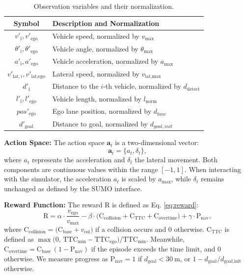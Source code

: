 \begin{table}[!ht]
    \centering
    \caption{Observation variables and their normalization.}
    \label{tab:obs}
    \begin{tabularx}{\columnwidth}{cX} %
    \toprule
    \textbf{Symbol} & \textbf{Description and Normalization} \\
    \midrule
    $v'_{\text{i}}, v'_{\text{ego}}$           & Vehicle speed, normalized by $v_{\text{max}}$ \\
    $\theta'_{\text{i}}, \theta'_{\text{ego}}$ & Vehicle angle, normalized by $\theta_{\text{max}}$ \\
    $a'_{\text{i}}, a'_{\text{ego}}$           & Vehicle acceleration, normalized by $a_{\text{max}}$ \\
    $v'_{\text{lat},i}, v'_{\text{lat,ego}}$   & Lateral speed, normalized by $v_{\text{lat,max}}$ \\
    $d'_{\text{i}}$                     & Distance to the $i$-th vehicle, normalized by $d_{\text{detect}}$ \\
    $l'_{\text{i}}, l'_{\text{ego}}$           & Vehicle length, normalized by $l_{\text{norm}}$ \\
    $pos'_{\text{ego}}$                 & Ego lane position, normalized by $d_{lane}$ \\
    $d'_{\text{goal}}$                  & Distance to goal, normalized by $d_{goal,init}$  \\
    \bottomrule
    \end{tabularx}
\end{table}

\textbf{Action Space:}
The action space $\mathbf{a}_t$ is a two-dimensional vector:
\begin{equation}
    \mathbf{a}_t = \{a_t, \delta_t\},
\end{equation}
where $a_t$ represents the acceleration and $\delta_t$ the lateral movement. Both components are continuous values within the range $[-1, 1]$. When interacting with the simulator, the acceleration $a_t$ is scaled by $a_{\text{max}}$, while $\delta_t$ remains unchanged as defined by the SUMO interface.


\textbf{Reward Function:}
The reward $\mathrm{R}$ is defined as Eq. \ref{eq:reward}:
\begin{equation}
    \label{eq:reward}
    \mathrm{R} = \alpha \cdot \frac{v_{\text{ego}}}{v_{\text{max}}}
          - \beta \cdot \bigl( \mathrm{C}_{\text{collision}} + \mathrm{C}_{\text{TTC}} + \mathrm{C}_{\text{overtime}} \bigr)
          + \gamma \cdot \mathrm{P}_{\text{nav}},
\end{equation}
where $\mathrm{C}_{\text{collision}} = \bigl(\mathrm{C}_{\text{base}} + v_{\text{col}}\bigr)$ if a collision occurs and $0$ otherwise.
$\mathrm{C}_{\text{TTC}}$ is defined as $\max\!\bigl(0, \,\text{TTC}_{\min} - \text{TTC}_{\text{ego}}\bigr)/\text{TTC}_{\min}$.
Meanwhile, $\mathrm{C}_{\text{overtime}} = \mathrm{C}_{\text{base}}\,(1 - \mathrm{P}_{\text{nav}})$ if the episode exceeds the time limit, and $0$ otherwise.
We measure progress as $\mathrm{P}_{\text{nav}} = 1$ if $d_{\text{goal}} < \SI{30}{\meter}$, or $1 - d_{\text{goal}} / d_{\text{goal,init}}$ otherwise.

